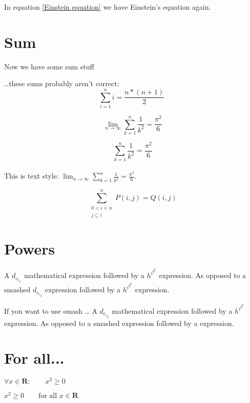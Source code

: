 \documentclass{article}
\begin{document}
In equation \eqref{Einstein equation} we have Einstein's equation again.

\section{Sum}
Now we have some sum stuff

\ldots these sums probably aren't correct:
\begin{equation}
\sum_{i=1}^{n} i = \frac{n * (n + 1)}{2}\;
\label{sum}
\end{equation}

\begin{equation}
  \lim_{n \to \infty}
  \sum_{k=1}^n \frac{1}{k^2}
  = \frac{\pi^2}{6}
 \end{equation}

\begin{equation}
  \sum_{k=1}^n \frac{1}{k^2}
  = \frac{\pi^2}{6}
 \end{equation}
\\
This is text style:
$\lim_{n \to \infty}
 \sum_{k=1}^n \frac{1}{k^2}
 = \frac{\pi^2}{6}$.
 
 \begin{equation}
\sum^n_{\substack{0<i<n \\
        j\subseteq i}}
   P(i,j) = Q(i,j)
\end{equation}

\section{Powers}

A $d_{e_{e_p}}$ mathematical
expression  followed by a
$h^{i^{g^h}}$ expression. As
opposed to a smashed
{$d_{e_{e_p}}$} expression
followed by a {$h^{i^{g^h}}$} expression.\newline

\noindent If you want to use smash \ldots \newline
A $d_{e_{e_p}}$ mathematical
expression  followed by a
$h^{i^{g^h}}$ expression. As
opposed to a smashed
 expression
followed by a
 expression.

\section{For all...}

$\forall x \in \mathbf{R}:
 \qquad x^{2} \geq 0$

\bigskip
\noindent $x^{2} \geq 0\qquad
 \text{for all }x\in\mathbf{R}$
\end{document}
